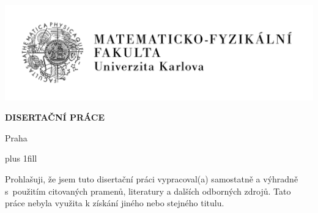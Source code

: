 

\pagestyle{empty}
\hypersetup{pageanchor=false}

\begin{center}

\centerline{\mbox{\includegraphics[width=166mm]{rc/logo-cs.pdf}}}

\vspace{-8mm}
\vfill

{\bf\Large DISERTAČNÍ PRÁCE}

\vfill

{\LARGE\AutorPrace}

\vspace{15mm}

{\LARGE\bfseries\NazevPrace}

\vfill

\Katedra

\vfill

{
\centerline{\vbox{}}}

\vfill

Praha \RokOdevzdani

\end{center}

\newpage


\openright
\hypersetup{pageanchor=true}
\pagestyle{plain}
\vglue 0pt plus 1fill

\noindent
Prohlašuji, že jsem tuto disertační práci vypracoval(a) samostatně a výhradně
s~použitím citovaných pramenů, literatury a dalších odborných zdrojů.
Tato práce nebyla využita k získání jiného nebo stejného titulu.

